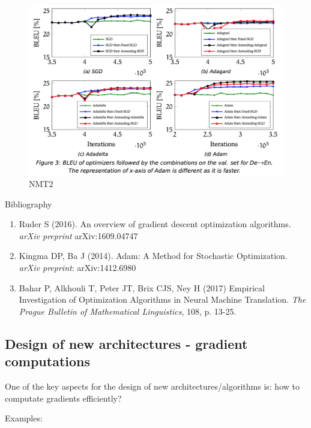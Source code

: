 \documentclass[english]{article}
\begin{document}


\begin{figure}
 \centering
\includegraphics[width = \textwidth]{NMT2.png}
\caption{NMT2}
\label{NMT2}
\end{figure}



\item 


{Bibliography}
\begin{enumerate}
\item Ruder S (2016). An overview of gradient descent optimization algorithms. \textit{arXiv preprint} arXiv:1609.04747 
\item Kingma DP, Ba J (2014). Adam: A Method for Stochastic Optimization. \textit{arXiv preprint}:  arXiv:1412.6980 
\item Bahar P, Alkhouli T, Peter JT, Brix CJS, Ney H (2017) Empirical Investigation of Optimization Algorithms in Neural Machine Translation. \textit{The Prague Bulletin of Mathematical Linguistics}, 108, p. 13-25. 
\end{enumerate}


\eenum

\subsection{Design of new architectures - gradient computations}
%
\bitem
\item One of the key aspects for the design of new architectures/algorithms is: how to computate gradients efficiently?

\item Examples:
\end{document}
